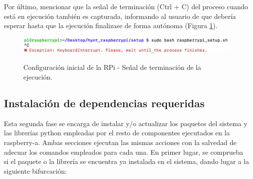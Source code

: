 \documentclass[12pt,a4paper, twoside]{report}
\begin{document}
	 Por último, mencionar que la señal de terminación (Ctrl + C) del proceso cuando está en ejecución también es capturada, informando al usuario de que debería esperar hasta que la ejecución finalizase de forma autónoma (Figura \ref{fig:userguide_setup_exitSignal}).
	 
	 	 \begin{figure}[!ht]   
			\caption{Configuración inicial de la RPi - Señal de terminación de la ejecución.} 
			\begin{center} 
				\includegraphics[width=12cm,height=0.9cm]{Images/userGuide/setup/exitSignal} \\
				\label{fig:userguide_setup_exitSignal} 
			\end{center}  
		\end{figure}
	 
	\subsection{Instalación de dependencias requeridas}
	 
	Esta segunda fase se encarga de instalar y/o actualizar los paquetes del sistema y las librerías \gls{python} empleadas por el resto de componentes ejecutados en la \gls{raspberry-a}. Ambas secciones ejecutan las mismas acciones con la salvedad de adecuar los comandos empleados para cada una. En primer lugar, se comprueba si el paquete o la librería se encuentra ya instalada en el sistema, dando lugar a la siguiente bifurcación:
	
\end{document}
